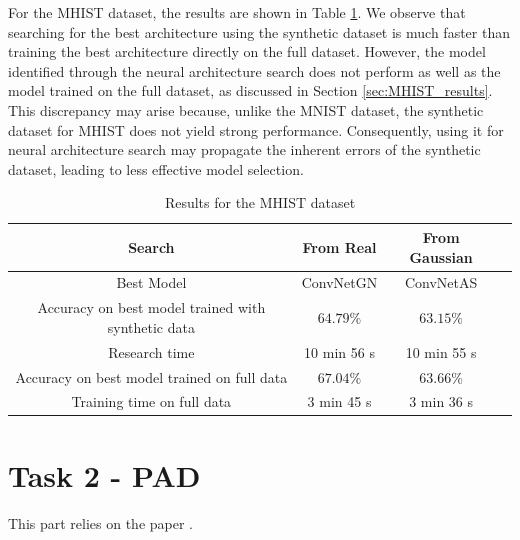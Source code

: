 \documentclass[onecolumn]{IEEEtran}
\begin{document}
For the MHIST dataset, the results are shown in Table \ref{tab:NAS_results_MHIST}. We observe that searching for the best architecture using the synthetic dataset is much faster than training the best architecture directly on the full dataset. However, the model identified through the neural architecture search does not perform as well as the model trained on the full dataset, as discussed in Section \ref{sec:MHIST_results}. This discrepancy may arise because, unlike the MNIST dataset, the synthetic dataset for MHIST does not yield strong performance. Consequently, using it for neural architecture search may propagate the inherent errors of the synthetic dataset, leading to less effective model selection.

\begin{table}[H]
    \centering
    \begin{tabular}{|c|c|c|c|}
        \hline
        Search & From Real & From Gaussian \\
        \hline
        Best Model & ConvNetGN & ConvNetAS\\
        \hline
        Accuracy on best model trained with synthetic data & $64.79\%$ & $63.15\%$ \\
        \hline
        Research time & 10 min 56 s & 10 min 55 s \\
        \hline
        Accuracy on best model trained on full data & $67.04\%$ & $63.66\%$ \\
        \hline
        Training time on full data & 3 min 45 s & 3 min 36 s \\
        \hline
    \end{tabular}
    \caption{Results for the MHIST dataset}
    \label{tab:NAS_results_MHIST}
\end{table}

\section{Task 2 - PAD}
This part relies on the paper \cite{li2024prioritize}.
\end{document}
